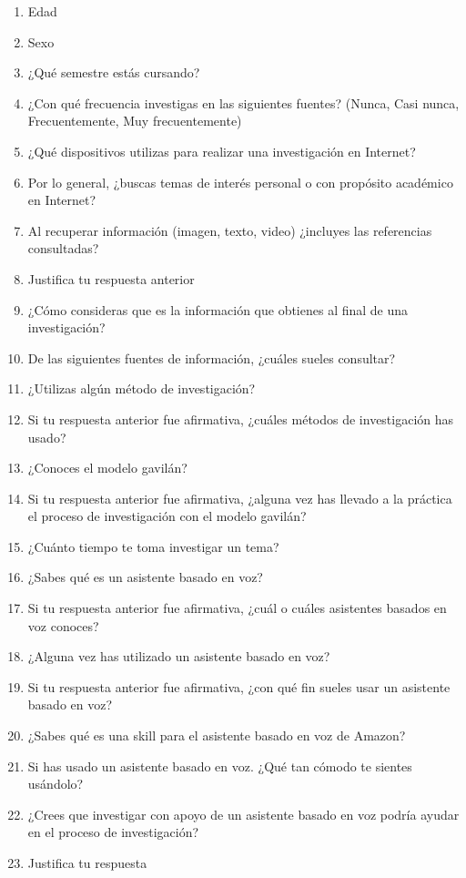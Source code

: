 \begin{tcolorbox}[colback=white!25!white,colframe=blue]
  \begin{enumerate}
    \item Edad
    \item Sexo
    \item ¿Qué semestre estás cursando?
    \item ¿Con qué frecuencia investigas en las siguientes fuentes? (Nunca, Casi nunca, Frecuentemente, Muy frecuentemente)
    \item ¿Qué dispositivos utilizas para realizar una investigación en Internet?
    \item Por lo general, ¿buscas temas de interés personal o con propósito académico en Internet?
    \item Al recuperar información (imagen, texto, video) ¿incluyes las referencias consultadas?
    \item Justifica tu respuesta anterior
    \item ¿Cómo consideras que es la información que obtienes al final de una investigación?
    \item De las siguientes fuentes de información, ¿cuáles sueles consultar?
    \item ¿Utilizas algún método de investigación?
    \item Si tu respuesta anterior fue afirmativa, ¿cuáles métodos de investigación has usado?
    \item ¿Conoces el modelo gavilán?
    \item Si tu respuesta anterior fue afirmativa, ¿alguna vez has llevado a la práctica el proceso de investigación con el modelo gavilán?
    \item ¿Cuánto tiempo te toma investigar un tema?
    \item ¿Sabes qué es un asistente basado en voz?
    \item Si tu respuesta anterior fue afirmativa, ¿cuál o cuáles asistentes basados en voz conoces?
    \item ¿Alguna vez has utilizado un asistente basado en voz?
    \item Si tu respuesta anterior fue afirmativa, ¿con qué fin sueles usar un asistente basado en voz?
    \item ¿Sabes qué es una skill para el asistente basado en voz de Amazon?
    \item Si has usado un asistente basado en voz. ¿Qué tan cómodo te sientes usándolo?
    \item ¿Crees que investigar con apoyo de un asistente basado en voz podría ayudar en el proceso de investigación?
    \item Justifica tu respuesta
  \end{enumerate}
\end{tcolorbox}

